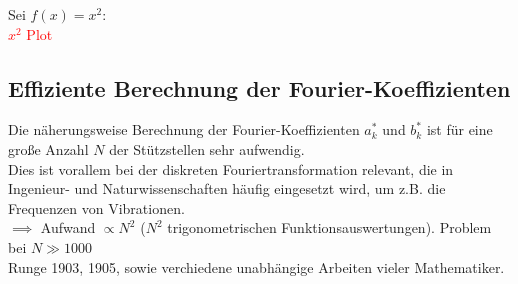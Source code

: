 \begin{egbox}
  Sei $f(x)=x^2$: \\
  \textcolor{red}{$x^2$ Plot} 
\end{egbox}

\subsection{Effiziente Berechnung der Fourier-Koeffizienten}
Die näherungsweise Berechnung der Fourier-Koeffizienten $a_k^*$ und $b_k^*$ ist für eine große Anzahl $N$ der 
Stützstellen sehr aufwendig. \\
Dies ist vorallem bei der diskreten Fouriertransformation relevant, die in Ingenieur- und Naturwissenschaften 
häufig eingesetzt wird, um z.B. die Frequenzen von Vibrationen. \\
$\implies$ Aufwand $\propto N^2$ ($N^2$ trigonometrischen Funktionsauswertungen). Problem bei $N\gg 1000$ \\
Runge 1903, 1905, sowie verchiedene unabhängige Arbeiten vieler Mathematiker.
